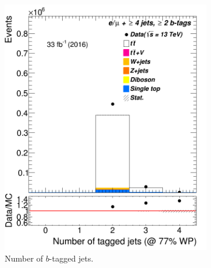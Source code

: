 \begin{figure} [b]
\begin{subfigure}{0.25\textwidth}
\includegraphics[width=\linewidth]{ControlPlots_emujets_2016_4incl_2incl/nBTags_emujets_2016.png}
\caption{Number of $b$-tagged jets.} \label{fig:Sec2}
\end{subfigure}
\hspace*{0.5cm}
\begin{subfigure}{0.25\textwidth}

\end{subfigure}
\end{figure}
